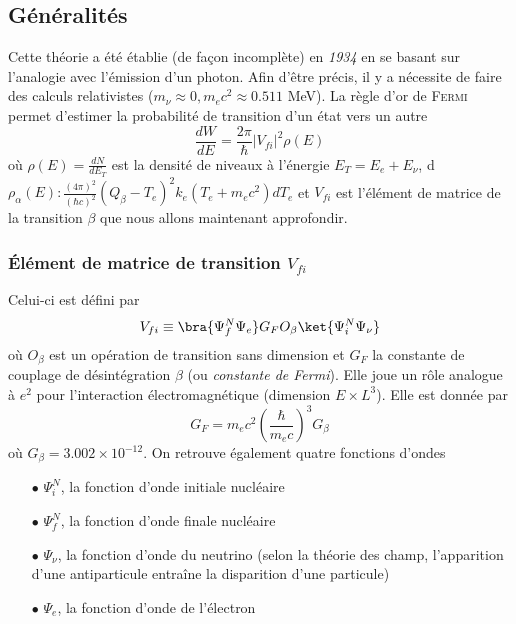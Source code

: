 \subsection{Généralités}
Cette théorie a été établie (de façon incomplète) en \textit{1934} en se basant sur l'analogie avec l'émission
d'un photon. Afin d'être précis, il y a nécessite de faire des calculs relativistes ($m_\nu\approx0, m_ec^2
\approx 0.511$ MeV). La règle d'or de \textsc{Fermi} permet d'estimer la probabilité de transition d'un état
vers un autre
\begin{equation}
\dfrac{dW}{dE} = \dfrac{2\pi}{\hbar}|V_{fi}|^2\rho(E)
\end{equation}
où $\rho(E) = \frac{dN}{dE_T}$ est la densité de niveaux à l'énergie $E_T=E_e+E_\nu$, d$\rho_\alpha(E) : 
\frac{(4\pi)^2}{(\hbar c)^2}(Q_\beta-T_e)^2k_e(T_e+m_ec^2)dT_e$ et $V_{fi}$ est l'élément de matrice de 
la transition $\beta$ que nous allons maintenant approfondir.

\subsubsection{Élément de matrice de transition $V_{fi}$}
Celui-ci est défini par
\begin{equation}
V_{fi}\equiv \bra{\Psi_f^N\Psi_e}G_FO_\beta\ket{\Psi_i^N\Psi_\nu}
\end{equation}
où $O_\beta$ est un opération de transition sans dimension et $G_F$ la constante de couplage de désintégration
$\beta$ (ou \textit{constante de Fermi}). Elle joue un rôle analogue à $e^2$ pour l'interaction électromagnétique 
(dimension $E\times L^3$). Elle est donnée par
\begin{equation}
G_F = m_ec^2\left(\frac{\hbar}{m_ec}\right)^3G_\beta
\end{equation}
où $G_\beta = 3.002\times 10^{-12}$. On retrouve également quatre fonctions d'ondes
\begin{enumerate}
\item[$\bullet$] $\Psi_i^N$, la fonction d'onde initiale nucléaire
\item[$\bullet$] $\Psi_f^N$, la fonction d'onde finale nucléaire
\item[$\bullet$] $\Psi_\nu$, la fonction d'onde du neutrino (selon la théorie des champ, l'apparition d'une 
antiparticule entraîne la disparition d'une particule)
\item[$\bullet$] $\Psi_e$, la fonction d'onde de l'électron
\end{enumerate}\ 

